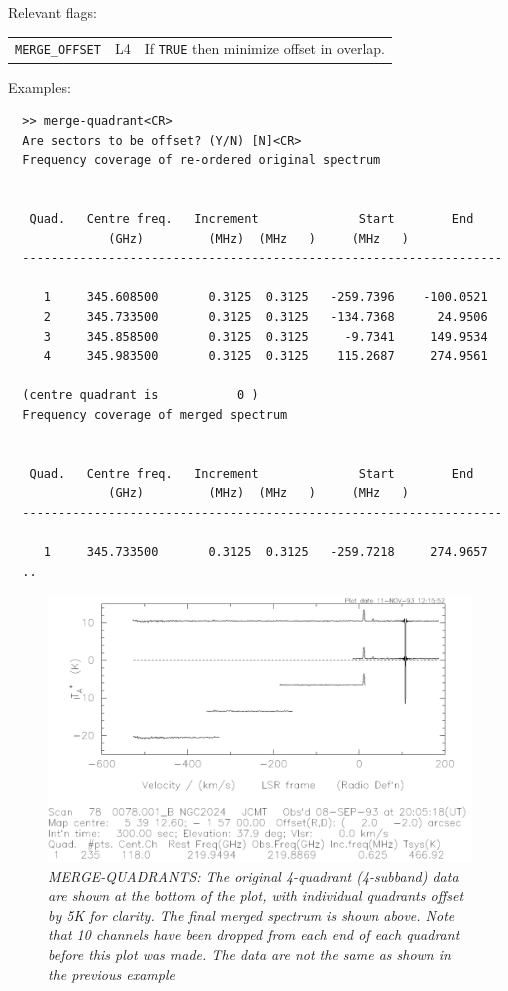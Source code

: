 \documentclass[11pt,twoside]{report}
\begin{document}
Relevant flags:\\
\begin{tabular}{lll}
  \verb+MERGE_OFFSET+ & L4 & If \verb+TRUE+ then minimize offset in overlap.
\end{tabular}

Examples:
\begin{verbatim}
  >> merge-quadrant<CR>
  Are sectors to be offset? (Y/N) [N]<CR>
  Frequency coverage of re-ordered original spectrum


   Quad.   Centre freq.   Increment              Start        End
              (GHz)         (MHz)  (MHz   )     (MHz   )
  -------------------------------------------------------------------

     1     345.608500       0.3125  0.3125   -259.7396    -100.0521
     2     345.733500       0.3125  0.3125   -134.7368      24.9506
     3     345.858500       0.3125  0.3125     -9.7341     149.9534
     4     345.983500       0.3125  0.3125    115.2687     274.9561

  (centre quadrant is           0 )
  Frequency coverage of merged spectrum


   Quad.   Centre freq.   Increment              Start        End
              (GHz)         (MHz)  (MHz   )     (MHz   )
  -------------------------------------------------------------------

     1     345.733500       0.3125  0.3125   -259.7218     274.9657
  ..
\end{verbatim}

\begin{figure}[htbp]
\begin{center}
\includegraphics[scale=0.65]{merge}
\protect\parbox{5.5in}
{\caption[MERGE]
{\sl
MERGE-QUADRANTS: The original 4-quadrant (4-subband) data are shown at the
bottom of the plot, with individual quadrants offset by 5K for clarity. The
final merged spectrum is shown above. Note that 10 channels have been dropped
from each end of each quadrant before this plot was made. The data are {\em
not} the same as shown in the previous example
\label{MERGE}
}
}
\end{center}
\end{figure}
\end{document}
